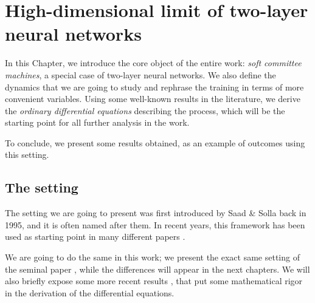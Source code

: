 \chapter{High-dimensional limit of two-layer neural networks} \label{chap:context}

In this Chapter, we introduce the core object of the entire work: \emph{soft committee machines},
a special case of two-layer neural networks.
We also define the dynamics that we are going to study and rephrase the training in terms
of more convenient variables. Using some well-known results in the literature, we derive the 
\emph{ordinary differential equations} describing the process, which will be the starting point 
for all further analysis in the work.

To conclude, we present some results obtained, as an example of 
outcomes using this setting.

\section{The setting}
The setting we are going to present was first introduced by Saad \& Solla \cite{saad1995line}
back in 1995,
and it is often named after them.
In recent years, this framework has been used as starting point in many different papers
\cite{aubin2018committee, goldt2019dynamics,veiga2022phase}.

We are going to do the same in this work; we present the exact same setting of the seminal paper \cite{saad1995line}, while the differences
will appear in the next chapters. We will also briefly expose some more recent results \cite{goldt2019dynamics},
that put some mathematical rigor in the derivation of the differential equations.

